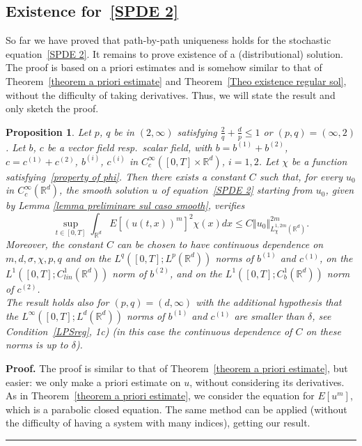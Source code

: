 \documentclass[a4paper,10pt]{article}
\newtheorem{proposition}[theorem]{Proposition}
\newenvironment{proof}[1][Proof]{\noindent\textbf{#1.} }{\ \rule{0.5em}{0.5em}}
\begin{document}
\subsection{Existence for~\eqref{SPDE 2}}

So far we have proved that path-by-path uniqueness holds for the stochastic equation~\eqref{SPDE 2}. It remains to prove existence of a (distributional) solution. The proof is based on a priori estimates and is somehow similar to that of Theorem~\ref{theorem a priori estimate} and Theorem~\ref{Theo existence regular sol}, without the difficulty of taking derivatives. Thus, we will state the result and only sketch the proof.

\begin{proposition}
Let $p$, $q$ be in $(2,\infty)$ satisfying $\frac2q+\frac{d}{p}\le1$ or $(p,q)=(\infty,2)$. Let $b$, $c$  be a vector field resp.\ scalar field, with $b=b^{(1)}+b^{(2)}$, $c=c^{(1)}+c^{(2)}$, $b^{(i)}$, $c^{(i)}$ in $C^\infty_c([0,T]\times\mathbb{R}^d)$, $i=1,2$. Let $\chi$ be a function satisfying~\eqref{property of phi}. Then there exists a constant $C$ such that, for every $u_0$ in $C^\infty_c(\mathbb{R}^d)$, the smooth solution $u$ of equation~\eqref{SPDE 2} starting from $u_0$, given by Lemma
\ref{lemma preliminare sul caso smooth}, verifies
\begin{equation*}
\sup_{t\in [0,T]  } \int_{\mathbb{R}^{d}}E\left[
(u(t,x))^{m}\right]  ^{2}\chi(x)
dx\leq C\left\Vert u_{0}\right\Vert _{L_{\chi}^{1,2m}(\mathbb{R}^{d})  }^{2m}.
\end{equation*}
Moreover, the constant $C$ can be chosen to have continuous dependence on $m,d,\sigma,\chi,p,q$ and on the $L^q([0,T];L^p(\mathbb{R}^d))$ norms of $b^{(1)}$ and $c^{(1)}$, on the $L^1([0,T];C^1_{lin}(\mathbb{R}^d))$ norm of $b^{(2)}$, and on the $L^1([0,T];C^1_b(\mathbb{R}^d))$ norm of $c^{(2)}$.\\
The result holds also for $(p,q)=(d,\infty)$ with the additional hypothesis that the $L^\infty([0,T];L^d(\mathbb{R}^d))$ norms of $b^{(1)}$ and $c^{(1)}$ are smaller than $\delta$, see Condition~\ref{LPSreg}, 1c) (in this case the continuous dependence of $C$ on these norms is up to $\delta$).
\end{proposition}

\begin{proof}
The proof is similar to that of Theorem~\ref{theorem a priori estimate}, but easier: we only make a priori estimate on $u$, without considering its derivatives. As in Theorem~\ref{theorem a priori estimate}, we consider the equation for $E[u^m]$, which is a parabolic closed equation. The same method can be applied (without the difficulty of having a system with many indices), getting our result.
\end{proof}
\end{document}
